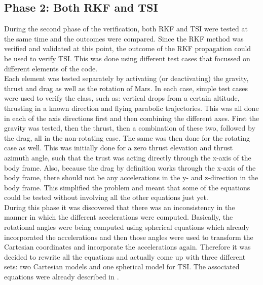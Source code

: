 \subsection{Phase 2: Both \ac{RKF} and \ac{TSI}}
\label{subsec:phase2com}
During the second phase of the verification, both \ac{RKF} and \ac{TSI} were tested at the same time and the outcomes were compared. Since the \ac{RKF} method was verified and validated at this point, the outcome of the \ac{RKF} propagation could be used to verify \ac{TSI}. This was done using different test cases that focussed on different elements of the code.\\ 
Each element was tested separately by activating (or deactivating) the gravity, thrust and drag as well as the rotation of Mars. In each case, simple test cases were used to verify the class, such as: vertical drops from a certain altitude, thrusting in a known direction and flying parabolic trajectories. This was all done in each of the axis directions first and then combining the different axes. First the gravity was tested, then the thrust, then a combination of these two, followed by the drag, all in the non-rotating case. The same was then done for the rotating case as well. This was initially done for a zero thrust elevation and thrust azimuth angle, such that the trust was acting directly through the x-axis of the body frame. Also, because the drag by definition works through the x-axis of the body frame, there should not be any accelerations in the y- and z-direction in the body frame. This simplified the problem and meant that some of the equations could be tested without involving all the other equations just yet. \\
During this phase it was discovered that there was an inconsistency in the manner in which the different accelerations were computed. Basically, the rotational angles were being computed using spherical equations which already incorporated the accelerations and then those angles were used to transform the Cartesian coordinates and incorporate the accelerations again. Therefore it was decided to rewrite all the equations and actually come up with three different sets: two Cartesian models and one spherical model for \ac{TSI}. The associated equations were already described in .

